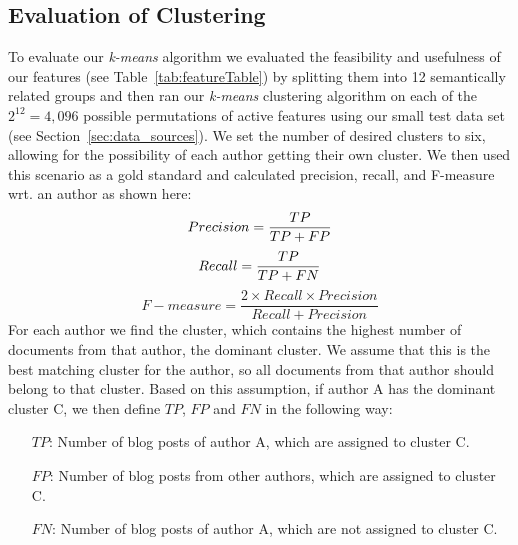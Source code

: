 \subsection{Evaluation of Clustering}
\label{sec:evaluation_clustering}
To evaluate our \textit{k-means} algorithm we evaluated the feasibility and usefulness of our features (see Table~\ref{tab:featureTable}) by splitting them into 12 semantically related groups and then ran our \textit{k-means} clustering algorithm on each of the $2^{12} = 4,096$ possible permutations of active features using our small test data set (see Section~\ref{sec:data_sources}).
We set the number of desired clusters to six, allowing for the possibility of each author getting their own cluster.
We then used this scenario as a gold standard and calculated precision, recall, and F-measure wrt. an author as shown here:
\begin{equation}
	Precision = \frac{TP}{TP + FP} \\
	\label{eq:precision}
\end{equation}
\begin{equation}
	Recall = \frac{TP}{TP + FN} \\
	\label{eq:recall}
\end{equation}
\begin{equation}
	F-measure = \frac{2 \times Recall \times Precision}{Recall + Precision}
	\label{eq:fMeasure}
\end{equation}
For each author we find the cluster, which contains the highest number of documents from that author, the dominant cluster.
We assume that this is the best matching cluster for the author, so all documents from that author should belong to that cluster.
Based on this assumption, if author A has the dominant cluster C, we then define $TP$, $FP$ and $FN$ in the following way:
\begin{itemize}
	\item[$TP$:] Number of blog posts of author A, which are assigned to cluster C. \\
	\item[$FP$:] Number of blog posts from other authors, which are assigned to cluster C. \\
	\item[$FN$:] Number of blog posts of author A, which are not assigned to cluster C.
\end{itemize}

